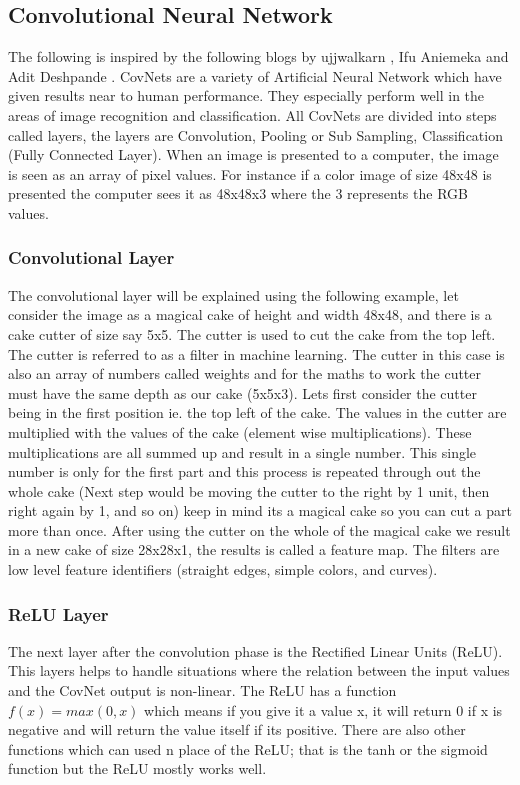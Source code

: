 \documentclass[12pt, a4paper,oneside]{report}
\begin{document}
\subsection{Convolutional Neural Network}
The following is inspired by the following blogs by ujjwalkarn \cite{cnnonline}, Ifu Aniemeka\cite{AFriendl79} and Adit Deshpande \cite{convo:online}.
CovNets are a variety of Artificial Neural Network which have given results near to human performance. They  especially perform well in the areas of image recognition and classification. All CovNets are divided into steps called layers, the layers are Convolution, Pooling or Sub Sampling, Classification (Fully Connected Layer). When an image is presented to a computer, the image is seen as an array of pixel values. For instance if a  color image of size 48x48 is presented the computer sees it as 48x48x3 where the 3 represents the RGB values. 

\subsubsection{Convolutional Layer}
The convolutional layer will be explained using the following example, let consider the image as a magical cake of height and width 48x48, and there is a cake cutter of size say 5x5. The cutter is used to cut the cake from the top left. The cutter is referred to as a filter in machine learning. The cutter in this case is also an array of numbers called weights and for the maths to work the cutter must have the same depth as our cake (5x5x3).
Lets first consider the cutter being in the first position ie. the top left of the cake. The values in the cutter are multiplied with the values of the cake (element wise multiplications). These multiplications are all summed up and result in a single number. This single number is only for the first part and this process is repeated through out the whole cake (Next step would be moving the cutter to the right by 1 unit, then right again by 1, and so on) keep in mind its a magical cake so you can cut a part more than once. After using the cutter on the whole of the magical cake we result in a new cake of size 28x28x1, the results is called a feature map. The filters are low level feature identifiers (straight edges, simple colors, and curves). 


\subsubsection{ReLU Layer}
The next layer after the convolution phase is the Rectified Linear Units (ReLU). This layers helps to handle situations where the relation between the input values and the CovNet output is non-linear. The ReLU has a function \(f(x) = max(0,x)\) which means if you give it a value x, it will return 0 if x is negative and will return the value itself if its positive. There are also other functions which can used n place of the ReLU; that is the tanh or the sigmoid function but the ReLU mostly works well.
\end{document}
